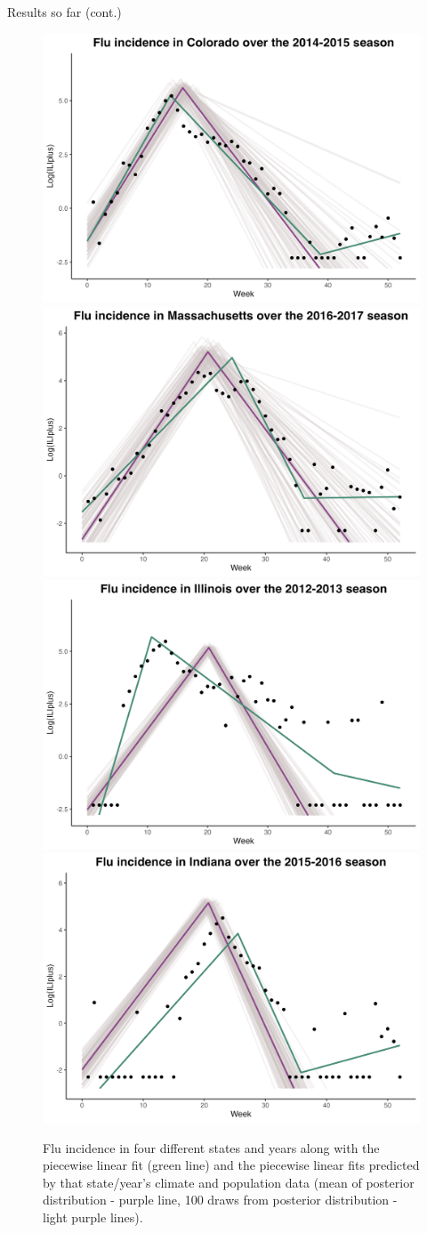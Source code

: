 
\begin{block}{Results so far (cont.)}
\begin{center}
	\begin{figure}
		\includegraphics[width = 0.48\columnwidth]{sections/images/Colorado2014.png}
		\includegraphics[width = 0.48\columnwidth]{sections/images/Massachusetts2016.png}
		\\
		\includegraphics[width = 0.48\columnwidth]{sections/images/Illinois2012.png}
		\includegraphics[width = 0.48\columnwidth]{sections/images/Indiana2015.png}\\
		\caption{Flu incidence in four different states and years along with the piecewise linear fit (green line) and the piecewise linear fits predicted by that state/year's climate and population data (mean of posterior distribution - purple line, 100 draws from posterior distribution - light purple lines).}

\end{figure}
\end{center}
\end{block}
